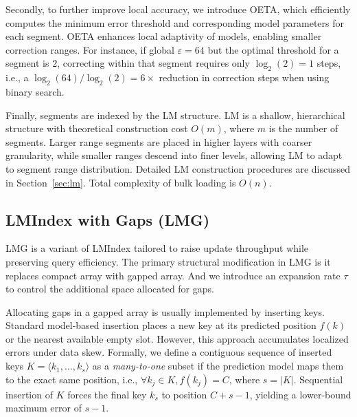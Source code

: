 Secondly, to further improve local accuracy, we introduce OETA, which efficiently computes the minimum error threshold and corresponding model parameters for each segment. OETA enhances local adaptivity of models, enabling smaller correction ranges. For instance, if global $\varepsilon = 64$ but the optimal threshold for a segment is $2$, correcting within that segment requires only $\log_2(2) = 1$ steps, i.e., a $\log_2(64)/\log_2(2) = 6\times$ reduction in correction steps when using binary search.



Finally, segments are indexed by the LM structure. LM is a shallow, hierarchical structure with theoretical construction cost $O(m)$, where $m$ is the number of segments. Larger range segments are placed in higher layers with coarser granularity, while smaller ranges descend into finer levels, allowing LM to adapt to segment range distribution. Detailed LM construction procedures are discussed in Section~\ref{sec:lm}. Total complexity of bulk loading is $O(n)$.

\subsection{LMIndex with Gaps (LMG)}
\label{sec:lmg}
LMG is a variant of LMIndex tailored to raise update throughput while preserving query efficiency. The primary structural modification in LMG is it replaces compact array with gapped array. And we introduce an expansion rate $\tau$ to control the additional space allocated for gaps.

Allocating gaps in a gapped array is usually implemented by inserting keys. Standard model-based insertion \cite{alex20} places a new key at its predicted position $f(k)$ or the nearest available empty slot. However, this approach accumulates localized errors under data skew. Formally, we define a contiguous sequence of inserted keys $K = \langle k_1, \dots, k_s \rangle$ as a \textit{many-to-one} subset if the prediction model maps them to the exact same position, i.e., $\forall k_j \in K, f(k_j) = C$, where $s = |K|$. Sequential insertion of $K$ forces the final key $k_s$ to position $C + s - 1$, yielding a lower-bound maximum error of $s-1$.

